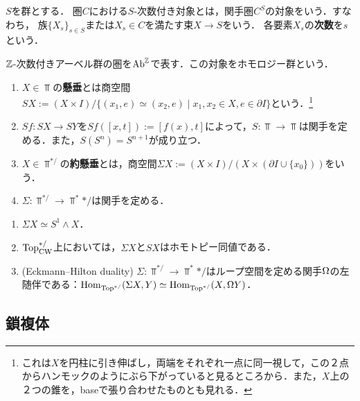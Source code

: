 \documentclass[uplatex,dvipdfmx]{jsreport}
\begin{document}
\begin{definition}
    $S$を群とする．
    圏$C$における$S$-次数付き対象とは，関手圏$C^S$の対象をいう．すなわち，
    族$\{X_s\}_{s\in S}$または$X_s\in C$を満たす束$X\to S$をいう．
    各要素$X_s$の\textbf{次数}を$s$という．
\end{definition}
\begin{example}
    $\mathbb{Z}$-次数付きアーベル群の圏を$\mathrm{Ab}^{\mathbb{Z}}$で表す．この対象をホモロジー群という．
\end{example}

\begin{definition}\mbox{}\label{def-suspension}
    \begin{enumerate}
        \item $X\in\Top$の\textbf{懸垂}とは商空間$SX:=(X\times I)/\{(x_1,e)\simeq(x_2,e)\mid x_1,x_2\in X,e\in\partial I\}$という．\footnote{これは$X$を円柱に引き伸ばし，両端をそれぞれ一点に同一視して，この２点からハンモックのようにぶら下がっていると見るところから．また，$X$上の２つの錐を，baseで張り合わせたものとも見れる．}
        \item $Sf:SX\to SY$を$Sf([x,t]):=[f(x),t]$によって，$S:\Top\to\Top$は関手を定める．また，$S(S^n)=S^{n+1}$が成り立つ．
        \item $X\in\Top^{*/}$の\textbf{約懸垂}とは，商空間$\Sigma X:=(X\times I)/(X\times(\partial I\cup\{x_0\}))$をいう．
        \item $\Sigma:\Top^{*/}\to\Top^*{*/}$は関手を定める．
    \end{enumerate}
\end{definition}

\begin{lemma}[約懸垂の表示]\mbox{}
    \begin{enumerate}
        \item $\Sigma X\simeq S^1\wedge X$．
        \item $\mathrm{Top}_{\mathrm{CW}}^{*/}$上においては，$\Sigma X$と$SX$はホモトピー同値である．
        \item (Eckmann–Hilton duality) $\Sigma:\Top^{*/}\to\Top^*{*/}$はループ空間を定める関手$\Omega$の左随伴である：$\mathrm{Hom}_{\mathrm{Top}^{*/}}(\Sigma X,Y)\simeq\mathrm{Hom}_{\mathrm{Top}^{*/}}(X,\Omega Y)$．
    \end{enumerate}
\end{lemma}

\subsection{鎖複体}
\end{document}
